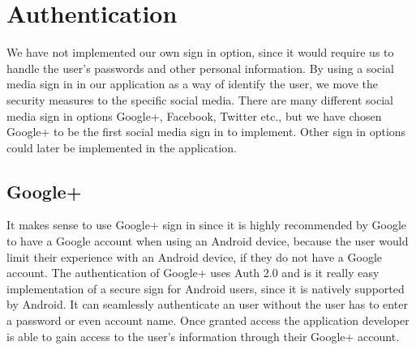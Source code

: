 \section{Authentication}
We have not implemented our own sign in option, since it would require us to handle the user's passwords and other personal information.
By using a social media sign in in our application as a way of identify the user, we move the security measures to the specific social media.
There are many different social media sign in options Google+, Facebook, Twitter etc., but we have chosen Google+ to be the first social media sign in to implement. Other sign in options could later be implemented in the application.

\subsection{Google+}
It makes sense to use Google+ sign in since it is highly recommended by Google to have a Google account when using an Android device, because the user would limit their experience with an Android device, if they do not have a Google account. 
The authentication of Google+ uses Auth 2.0 and is it really easy implementation of a secure sign for Android users, since it is natively supported by Android. 
It can seamlessly authenticate an user without the user has to enter a password or even account name. 
Once granted access the application developer is able to gain access to the user's information through their Google+ account.\cite{googleplusvideo}

